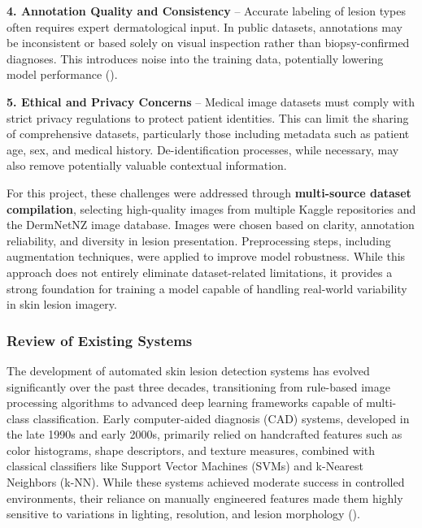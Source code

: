 \documentclass[
  12pt,
  oneside]{article}
\begin{document}
\textbf{4. Annotation Quality and Consistency} -- Accurate labeling of
lesion types often requires expert dermatological input. In public
datasets, annotations may be inconsistent or based solely on visual
inspection rather than biopsy-confirmed diagnoses. This introduces noise
into the training data, potentially lowering model performance
().

\textbf{5. Ethical and Privacy Concerns} -- Medical image datasets must
comply with strict privacy regulations to protect patient identities.
This can limit the sharing of comprehensive datasets, particularly those
including metadata such as patient age, sex, and medical history.
De-identification processes, while necessary, may also remove
potentially valuable contextual information.

For this project, these challenges were addressed through
\textbf{multi-source dataset compilation}, selecting high-quality images
from multiple Kaggle repositories and the DermNetNZ image database.
Images were chosen based on clarity, annotation reliability, and
diversity in lesion presentation. Preprocessing steps, including
augmentation techniques, were applied to improve model robustness. While
this approach does not entirely eliminate dataset-related limitations,
it provides a strong foundation for training a model capable of handling
real-world variability in skin lesion imagery.

\subsubsection{Review of Existing
Systems}\label{review-of-existing-systems}

The development of automated skin lesion detection systems has evolved
significantly over the past three decades, transitioning from rule-based
image processing algorithms to advanced deep learning frameworks capable
of multi-class classification. Early computer-aided diagnosis (CAD)
systems, developed in the late 1990s and early 2000s, primarily relied
on handcrafted features such as color histograms, shape descriptors, and
texture measures, combined with classical classifiers like Support
Vector Machines (SVMs) and k-Nearest Neighbors (k-NN). While these
systems achieved moderate success in controlled environments, their
reliance on manually engineered features made them highly sensitive to
variations in lighting, resolution, and lesion morphology
().
\end{document}
